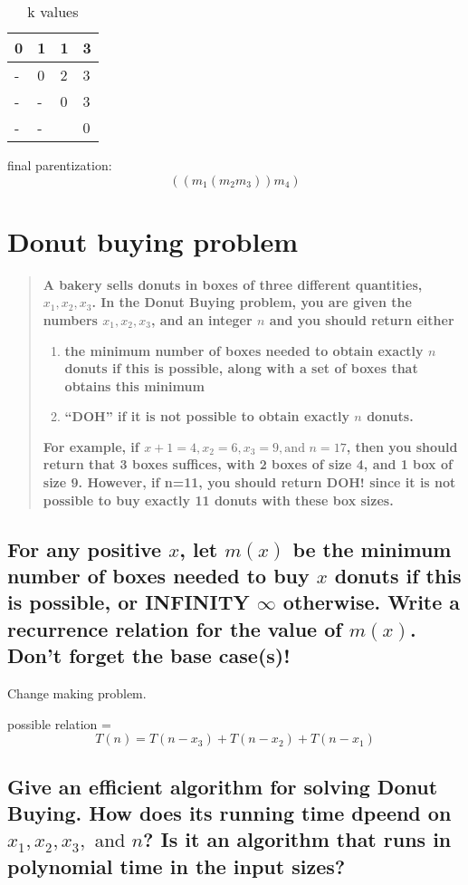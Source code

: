 \documentclass[titlepage]{article}\usepackage[]{graphicx}\usepackage[]{color}
\begin{document}
\begin{table}[h]
	\caption{k values}
	\label{tab:kval}
	\begin{tabular}{|l|l|l|l|}
		\hline
		0 & 1 & 1 & 3 \\ \hline
		- & 0  & 2  & 3 \\ \hline
		- & -  & 0  & 3  \\ \hline
		- & -  &    & 0  \\ \hline
	\end{tabular}
\end{table}

final parentization:
\[ \left( (m_1 (m_2 m_3)) m_4 \right)\]

\section{Donut buying problem}
\begin{quote}
	\textbf{A bakery sells donuts in boxes of three different quantities, $x_1, x_2,
		x_3$. In the Donut Buying problem, you are given the numbers $x_1, x_2,
		x_3$, and an integer $n$ and you should return either }
	\begin{enumerate}
		\item \textbf{the minimum number of boxes needed to obtain exactly $n$ donuts if
			this is possible, along with a set of boxes that obtains this minimum}
		\item \textbf{``DOH'' if it is not possible to obtain exactly $n$ donuts. }
	\end{enumerate}
	\textbf{For example, if $x+1 = 4, x_2 =6, x_3 = 9, \text{and } n=17$, then you should
	return that 3 boxes suffices, with 2 boxes of size 4, and 1 box of size 9.
	However, if n=11, you should return DOH! since it is not possible to buy
exactly 11 donuts with these box sizes. }
\end{quote}

\subsection{For any positive $x$, let $m(x)$ be the minimum number of boxes
  needed to buy $x$ donuts if this is possible, or INFINITY $\infty$
  otherwise. Write a recurrence relation for the value of $m(x)$. Don't forget
the base case(s)!}

Change making problem.

possible relation = 
\[ T(n) = T(n-x_3) + T(n-x_2) + T(n- x_1) \]

\subsection{ Give an efficient algorithm for solving Donut Buying. How does its
  running time dpeend on $x_1, x_2, x_3,\text{ and } n$? Is it an algorithm
that runs in polynomial time in the input sizes?} 
\end{document}

